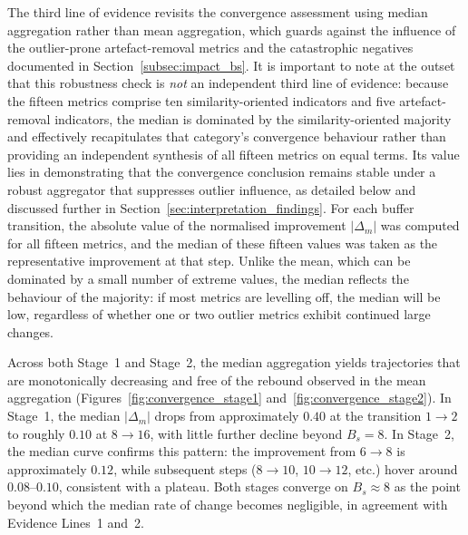 \documentclass[MScCS,12pt,oneside,final]{uccthesis}
\begin{document}
The third line of evidence revisits the convergence assessment using median aggregation rather than mean aggregation, which guards against the influence of the outlier-prone artefact-removal metrics and the catastrophic negatives documented in Section~\ref{subsec:impact_bs}. It is important to note at the outset that this robustness check is \emph{not} an independent third line of evidence: because the fifteen metrics comprise ten similarity-oriented indicators and five artefact-removal indicators, the median is dominated by the similarity-oriented majority and effectively recapitulates that category's convergence behaviour rather than providing an independent synthesis of all fifteen metrics on equal terms. Its value lies in demonstrating that the convergence conclusion remains stable under a robust aggregator that suppresses outlier influence, as detailed below and discussed further in Section~\ref{sec:interpretation_findings}. For each buffer transition, the absolute value of the normalised improvement $|\Delta_m|$ was computed for all fifteen metrics, and the median of these fifteen values was taken as the representative improvement at that step. Unlike the mean, which can be dominated by a small number of extreme values, the median reflects the behaviour of the majority: if most metrics are levelling off, the median will be low, regardless of whether one or two outlier metrics exhibit continued large changes.

Across both Stage~1 and Stage~2, the median aggregation yields trajectories that are monotonically decreasing and free of the rebound observed in the mean aggregation (Figures~\ref{fig:convergence_stage1} and~\ref{fig:convergence_stage2}). In Stage~1, the median $|\Delta_m|$ drops from approximately $0.40$ at the transition $1 \to 2$ to roughly $0.10$ at $8 \to 16$, with little further decline beyond $B_s = 8$. In Stage~2, the median curve confirms this pattern: the improvement from $6 \to 8$ is approximately $0.12$, while subsequent steps ($8 \to 10$, $10 \to 12$, etc.) hover around $0.08$--$0.10$, consistent with a plateau. Both stages converge on $B_s \approx 8$ as the point beyond which the median rate of change becomes negligible, in agreement with Evidence Lines~1 and~2.
\end{document}
